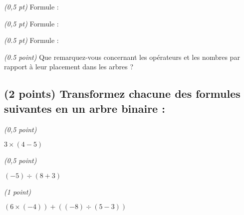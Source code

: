 \documentclass[11pt,a4paper]{article}
\begin{document}
\begin{table}[ht!]
  \centering
  \begin{minipage}{0.30\textwidth}
    \centering

\textit{(0,5 pt)} Formule :

  \end{minipage}
  \hfillx
  \begin{minipage}{0.30\textwidth}
    \centering

\textit{(0,5 pt)} Formule :

  \end{minipage}
  \hfillx
  \begin{minipage}{0.40\textwidth}
    \centering

\textit{(0.5 pt)} Formule :

  \end{minipage}
\end{table}

\vspace*{1cm}

\noindent \textit{(0.5 point)} Que remarquez-vous concernant les opérateurs et les nombres par rapport à leur placement dans les arbres ?

\bigskip
\bigskip

\bigskip


\subsection{(2 points) Transformez chacune des formules suivantes en un arbre binaire : }

\vspace*{-0.5cm}

\begin{table}[ht!]
  \centering
  \begin{minipage}{0.25\textwidth}
    \centering

\textit{(0,5 point)}

$ 3 \times (4 - 5) $

  \end{minipage}
  \hfillx
  \begin{minipage}{0.25\textwidth}
    \centering

\textit{(0,5 point)}

$ (-5) \div (8 + 3) $

  \end{minipage}
  \hfillx
  \begin{minipage}{0.50\textwidth}
    \centering

\textit{(1 point)}

$ (6 \times (-4)) + ((-8) \div (5 - 3)) $

  \end{minipage}
\end{table}
\end{document}

